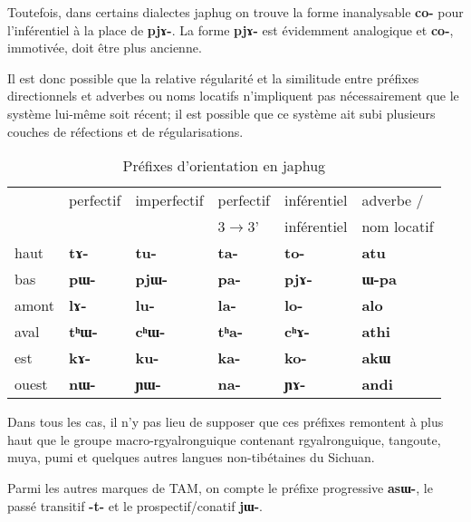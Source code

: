 \documentclass[oldfontcommands,oneside,a4paper,11pt]{article}
\newcommand{\ipa}[1]{{\phon\textbf{\mbox{#1}}}} %
\begin{document}
Toutefois, dans certains dialectes japhug on trouve la forme inanalysable \ipa{co-} pour l'inférentiel à la place de \ipa{pjɤ-}. La forme \ipa{pjɤ-} est évidemment analogique et \ipa{co-}, immotivée, doit être plus ancienne.

Il est donc possible que la relative régularité et la similitude entre préfixes directionnels et adverbes ou noms locatifs n'impliquent pas nécessairement que le système lui-même soit récent; il est possible que ce système ait subi plusieurs couches de réfections et de régularisations. 

\begin{table}[H]
\caption{Préfixes d'orientation en japhug} \label{tab:orientation}
\begin{tabular}{llllll}
\toprule
   &  	perfectif &  	imperfectif  &  	perfectif   &  	inférentiel  & adverbe / \\  	
  &  	  &  	   &  	  3$\rightarrow$3'  &  	inférentiel  & nom locatif\\  	
   \midrule
haut   &  	\ipa{tɤ-}   &  	\ipa{tu-}   &  	\ipa{ta-}   &  	\ipa{to-}  & \ipa{atu} \\  	
bas   &  	\ipa{pɯ-}   &  	\ipa{pjɯ-}   &  	\ipa{pa-}   &  	\ipa{pjɤ-}  &\ipa{ɯ-pa} \\  	
amont   &  	\ipa{lɤ-}   &  	\ipa{lu-}   &  	\ipa{la-}   &  	\ipa{lo-}  & \ipa{alo}  \\  	
aval   &  	\ipa{tʰɯ-}   &  	\ipa{cʰɯ-}   &  	\ipa{tʰa-}   &  	\ipa{cʰɤ-} & \ipa{athi}  \\  	
est   &  	\ipa{kɤ-}   &  	\ipa{ku-}   &  	\ipa{ka-}   &  	\ipa{ko-}  & \ipa{akɯ}  \\  	
ouest   &  	\ipa{nɯ-}   &  	\ipa{ɲɯ-}   &  	\ipa{na-}   &  	\ipa{ɲɤ-}  & \ipa{andi}  \\  	
\bottomrule
\end{tabular} 
\end{table}

Dans tous les cas, il n'y pas lieu de supposer que ces préfixes remontent à plus haut que le groupe macro-rgyalronguique contenant rgyalronguique, tangoute, muya, pumi et quelques autres langues non-tibétaines du Sichuan. 


Parmi les autres marques de TAM, on compte le préfixe progressive \ipa{asɯ-}, le passé transitif \ipa{-t-} et le prospectif/conatif \ipa{jɯ-}. 
\end{document}
